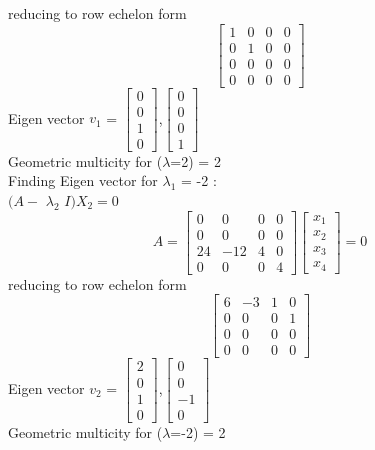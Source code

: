 \documentclass[12pt]{article}
\begin{document}
\begin{enumerate}[label=\alph*)]
\[\]
reducing to row echelon form
\[
\begin{bmatrix} 1 & 0 & 0 & 0\\0 & 1 & 0 & 0\\0 & 0 & 0 & 0\\0 & 0 & 0 & 0\end{bmatrix}
\]
Eigen vector $v_{1}$ = $\begin{bmatrix} 0\\0\\1\\0\end{bmatrix}$,$\begin{bmatrix} 0\\0\\0\\1\end{bmatrix}$\\
Geometric multicity for ($\lambda$=2) = 2\\
Finding Eigen vector for $\lambda_{1}$ = -2 :\\
$(A-$ $\lambda_{2}$ $I)X_{2} = 0$
\[
A = \begin{bmatrix} 0 & 0 & 0 & 0\\0 & 0 & 0 & 0\\24 & -12 & 4 & 0\\0 & 0 & 0 & 4\end{bmatrix}\begin{bmatrix} x_{1}\\x_{2}\\x_{3}\\x_{4}\end{bmatrix} = 0
\]
reducing to row echelon form
\[
\begin{bmatrix} 6 & -3 & 1 & 0\\0 & 0 & 0 & 1\\0 & 0 & 0 & 0\\0 & 0 & 0 & 0\end{bmatrix}
\]
Eigen vector $v_{2}$ = $\begin{bmatrix} 2\\0\\1\\0\end{bmatrix}$,$\begin{bmatrix} 0\\0\\-1\\0\end{bmatrix}$\\
Geometric multicity for ($\lambda$=-2) = 2\\

\end{enumerate}
\end{document}
